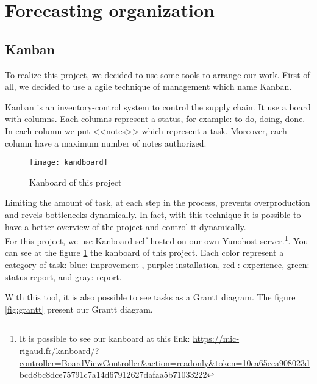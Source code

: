 \section{Forecasting organization}

\subsection{Kanban}

To realize this project, we decided to use some tools to arrange our work. First of all, we decided to use a agile
technique of management which name Kanban.~\\



Kanban is an inventory-control system to control the supply chain. It use a board with columns. Each columns
represent a status, for example: to do, doing, done. In each column we put <<notes>> which represent a task.
Moreover, each column have a maximum number of notes authorized.


\begin{figure}[h]
  \centering
  \texttt{[image: kandboard]}
  \caption{Kanboard of this project}
  \label{fig:kanboard}
\end{figure}


Limiting the amount of task, at each step in the process, prevents overproduction and revels bottlenecks
dynamically. In fact, with this technique it is possible to have a better overview of the project and control it
dynamically.
~\\

For this project, we use Kanboard\cite{guillot:kanboard} self-hosted on our own Yunohost server.\footnote{ It is possible to
  see our kanboard at this link:
  \url{https://mic-rigaud.fr/kanboard/?controller=BoardViewController&action=readonly&token=10ea65eca908023dbcd8bc8dce75791c7a14d67912627dafaa5b71033222}}.
You can see at the figure \ref{fig:kanboard} the kanboard of this project. Each color represent a category of task:
blue: improvement , purple: installation, red : experience, green: status report, and gray: report.

With this tool, it is also possible to see tasks as a Grantt diagram. The figure \ref{fig:grantt} present our
Grantt diagram.

